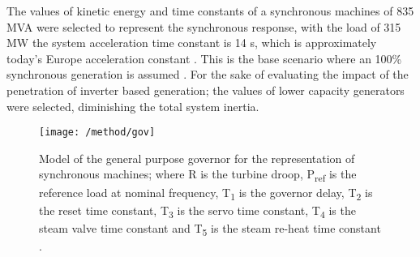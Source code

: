 The values of kinetic energy and time constants of a synchronous machines of 835 MVA were selected to represent the synchronous response, with the load of 315 MW the system acceleration time constant is 14 s, which is approximately today’s Europe acceleration constant \cite{ENTSOE.2016}. This is the base scenario where an 100\% synchronous generation is assumed . For the sake of evaluating the impact of the penetration of inverter based generation; the values of lower capacity generators were selected, diminishing the total system inertia.\\
\begin{figure}[h]
	\centering
	\texttt{[image: /method/gov]}
	\caption{Model of the general purpose governor for the representation of synchronous machines; where R is the turbine droop, P\textsubscript{ref} is the reference load at nominal frequency, T\textsubscript{1} is the governor delay, T\textsubscript{2} is the reset time constant, T\textsubscript{3} is the servo time constant, T\textsubscript{4} is the steam valve time constant and T\textsubscript{5} is the steam re-heat time constant \cite{Anderson.2002}.}
	\label{fig:gov}
\end{figure}

